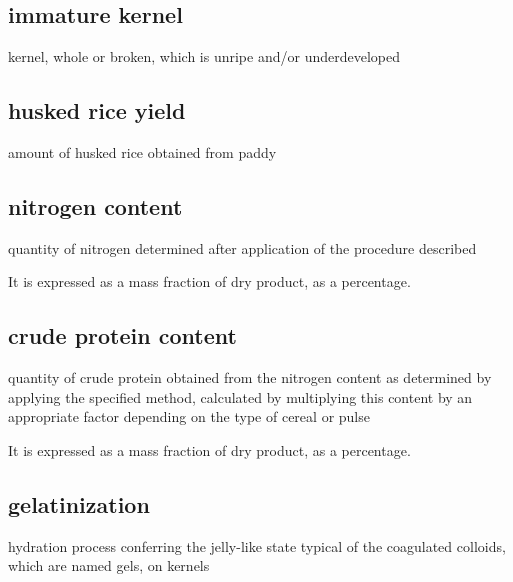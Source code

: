 \subsection*{immature kernel}

kernel, whole or broken, which is unripe and/or underdeveloped

\subsection*{husked rice yield}
amount of husked rice obtained from paddy

\begin{source}
\end{source}

\subsection*{nitrogen content}
quantity of nitrogen determined after application of the procedure described

\begin{note}
  It is expressed as a mass fraction of dry product, as a percentage.
\end{note}

\begin{source}
\end{source}

\subsection*{crude protein content}
quantity of crude protein obtained from the nitrogen content as determined by applying the specified method, calculated by multiplying this content by an appropriate factor depending on the type of cereal or pulse

\begin{note}
  It is expressed as a mass fraction of dry product, as a percentage.
\end{note}

\begin{source}
\end{source}

\subsection*{gelatinization}
\label{gelatinization}
hydration process conferring the jelly-like state typical of the coagulated colloids, which are named gels, on kernels

